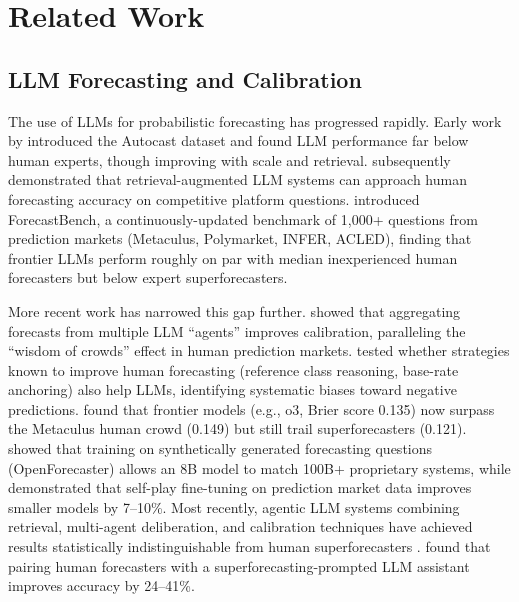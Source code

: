 \documentclass[11pt]{article}
\begin{document}
\section{Related Work}
\label{sec:related}

\subsection{LLM Forecasting and Calibration}

The use of LLMs for probabilistic forecasting has progressed rapidly. Early work by \citet{zou2022forecasting} introduced the Autocast dataset and found LLM performance far below human experts, though improving with scale and retrieval. \citet{halawi2024approaching} subsequently demonstrated that retrieval-augmented LLM systems can approach human forecasting accuracy on competitive platform questions. \citet{zou2024forecastbench} introduced ForecastBench, a continuously-updated benchmark of 1,000+ questions from prediction markets (Metaculus, Polymarket, INFER, ACLED), finding that frontier LLMs perform roughly on par with median inexperienced human forecasters but below expert superforecasters.

More recent work has narrowed this gap further. \citet{schoenegger2024wisdom} showed that aggregating forecasts from multiple LLM ``agents'' improves calibration, paralleling the ``wisdom of crowds'' effect in human prediction markets. \citet{pratt2024forecasting} tested whether strategies known to improve human forecasting (reference class reasoning, base-rate anchoring) also help LLMs, identifying systematic biases toward negative predictions. \citet{lu2025evaluating} found that frontier models (e.g., o3, Brier score 0.135) now surpass the Metaculus human crowd (0.149) but still trail superforecasters (0.121). \citet{chandak2025scaling} showed that training on synthetically generated forecasting questions (OpenForecaster) allows an 8B model to match 100B+ proprietary systems, while \citet{turtel2025teach} demonstrated that self-play fine-tuning on prediction market data improves smaller models by 7--10\%. Most recently, agentic LLM systems combining retrieval, multi-agent deliberation, and calibration techniques have achieved results statistically indistinguishable from human superforecasters \cite{aia2025forecaster}. \citet{schoenegger2024augmented} found that pairing human forecasters with a superforecasting-prompted LLM assistant improves accuracy by 24--41\%.
\end{document}
